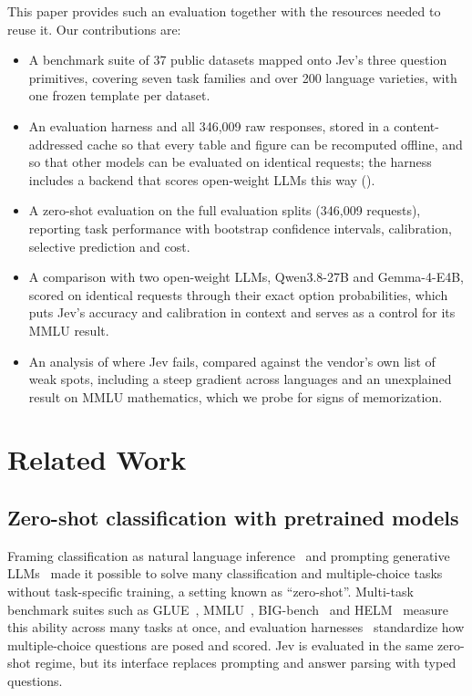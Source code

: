 \documentclass[table]{article}
\begin{document}
This paper provides such an evaluation together with the resources needed to reuse it. Our contributions are:
\begin{itemize}[leftmargin=*,noitemsep]
    \item A benchmark suite of 37 public datasets mapped onto Jev's three question primitives, covering seven task families and over 200 language varieties, with one frozen template per dataset.
    \item An evaluation harness and all 346{,}009 raw responses, stored in a content-addressed cache so that every table and figure can be recomputed offline, and so that other models can be evaluated on identical requests; the harness includes a backend that scores open-weight LLMs this way ().
    \item A zero-shot evaluation on the full evaluation splits (346{,}009 requests), reporting task performance with bootstrap confidence intervals, calibration, selective prediction and cost.
    \item A comparison with two open-weight LLMs, Qwen3.8-27B and Gemma-4-E4B, scored on identical requests through their exact option probabilities, which puts Jev's accuracy and calibration in context and serves as a control for its MMLU result.
    \item An analysis of where Jev fails, compared against the vendor's own list of weak spots, including a steep gradient across languages and an unexplained result on MMLU mathematics, which we probe for signs of memorization.
\end{itemize}


\section{Related Work}

\subsection{Zero-shot classification with pretrained models}
Framing classification as natural language inference~\cite{yin2019zeroshot} and prompting generative LLMs~\cite{brown2020language} made it possible to solve many classification and multiple-choice tasks without task-specific training, a setting known as ``zero-shot''. Multi-task benchmark suites such as GLUE~\cite{wang-etal-2018-glue}, MMLU~\cite{hendrycks2021measuringmassivemultitasklanguage}, BIG-bench~\cite{srivastava2023beyond} and HELM~\cite{liang2023holistic} measure this ability across many tasks at once, and evaluation harnesses~\cite{biderman2026lessonstrenchesreproducibleevaluation} standardize how multiple-choice questions are posed and scored. Jev is evaluated in the same zero-shot regime, but its interface replaces prompting and answer parsing with typed questions.
\end{document}
